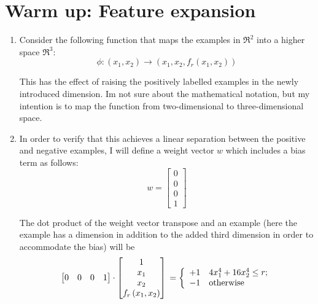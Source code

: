 \section{Warm up: Feature expansion}

\begin{enumerate}

\item Consider the following function that maps the examples in $\Re^2$ into a higher space $\Re^3$:
\begin{equation*}
\phi: \left ( x_1, x_2 \right ) \rightarrow \left (x_1, x_2, f_r \left (x_1, x_2 \right ) \right )
\end{equation*}

This has the effect of raising the positively labelled examples in the newly introduced dimension. I\textquotesingle m not sure about the mathematical notation, but my intention is to map the function from two-dimensional to three-dimensional space. 

\item In order to verify that this achieves a linear separation between the positive and negative examples, I will define a weight vector $w$ which includes a bias term as follows:
\begin{equation*}
     w=\begin{bmatrix}
         0\\
         0 \\
         0\\
         1
        \end{bmatrix}
  \end{equation*}

The dot product of the weight vector transpose and an example (here the example has a dimension in addition to the added third dimension in order to accommodate the bias) will be
 \begin{equation*}
    \begin{bmatrix}
         0 & 0 & 0 & 1
     \end{bmatrix}
     \cdot
        \begin{bmatrix}
         1\\
         x_1 \\
         x_2\\
         f_r \left (x_1, x_2 \right )
        \end{bmatrix}\\
         = 
        \left\{
            \begin{array}{rl}
      +1 & 4x_1^4 + 16x_2^4 \leq r;\\
      -1 & \mbox{otherwise}
    \end{array}
    \right.
   \end{equation*}


\end{enumerate}
